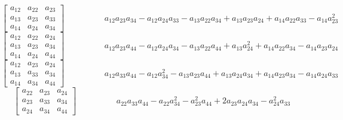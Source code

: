 \documentclass[12pt]{article}
\begin{document}
$$\left[\begin{matrix}a_{12} & a_{22} & a_{23}\\a_{13} & a_{23} & a_{33}\\a_{14} & a_{24} & a_{34}\end{matrix}\right]\hspace{2cm} a_{12} a_{23} a_{34} - a_{12} a_{24} a_{33} - a_{13} a_{22} a_{34} + a_{13} a_{23} a_{24} + a_{14} a_{22} a_{33} - a_{14} a_{23}^{2}$$   
$$\left[\begin{matrix}a_{12} & a_{22} & a_{24}\\a_{13} & a_{23} & a_{34}\\a_{14} & a_{24} & a_{44}\end{matrix}\right]\hspace{2cm} a_{12} a_{23} a_{44} - a_{12} a_{24} a_{34} - a_{13} a_{22} a_{44} + a_{13} a_{24}^{2} + a_{14} a_{22} a_{34} - a_{14} a_{23} a_{24}$$   
$$\left[\begin{matrix}a_{12} & a_{23} & a_{24}\\a_{13} & a_{33} & a_{34}\\a_{14} & a_{34} & a_{44}\end{matrix}\right]\hspace{2cm} a_{12} a_{33} a_{44} - a_{12} a_{34}^{2} - a_{13} a_{23} a_{44} + a_{13} a_{24} a_{34} + a_{14} a_{23} a_{34} - a_{14} a_{24} a_{33}$$   
$$\left[\begin{matrix}a_{22} & a_{23} & a_{24}\\a_{23} & a_{33} & a_{34}\\a_{24} & a_{34} & a_{44}\end{matrix}\right]\hspace{2cm} a_{22} a_{33} a_{44} - a_{22} a_{34}^{2} - a_{23}^{2} a_{44} + 2 a_{23} a_{24} a_{34} - a_{24}^{2} a_{33}$$
\end{document}
